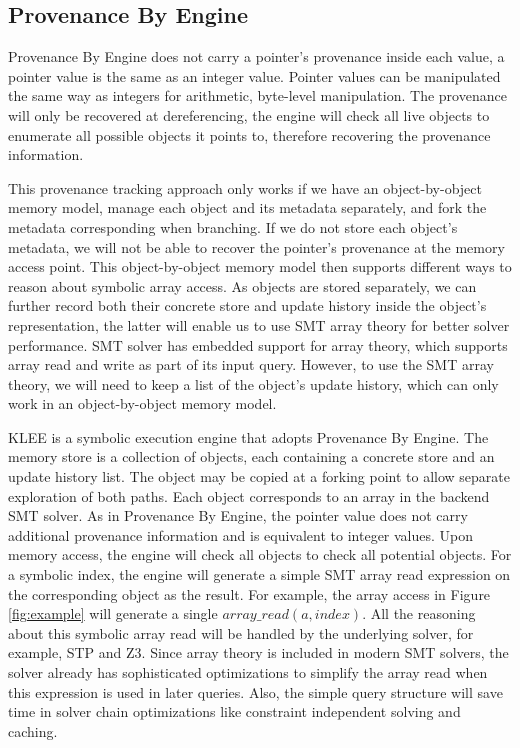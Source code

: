 \documentclass[sigplan, nonacm]{acmart}\settopmatter{printfolios=true,printccs=false,printacmref=false}
\newcommand{\klee}{\textsc{KLEE}\xspace}
\begin{document}
\subsection[]{Provenance By Engine}
Provenance By Engine does not carry a pointer's provenance inside each value, a pointer value is the same as an integer value. Pointer values can be manipulated the same way as integers for arithmetic, byte-level manipulation. The provenance will only be recovered at dereferencing, the engine will check all live objects to enumerate all possible objects it points to, therefore recovering the provenance information.\par
This provenance tracking approach only works if we have an object-by-object memory model, manage each object and its metadata separately, and fork the metadata corresponding when branching. If we do not store each object's metadata, we will not be able to recover the pointer's provenance at the memory access point. This object-by-object memory model then supports different ways to reason about symbolic array access. As objects are stored separately, we can further record both their concrete store and update history inside the object's representation, the latter will enable us to use SMT array theory for better solver performance. SMT solver has embedded support for array theory, which supports array read and write as part of its input query. However, to use the SMT array theory, we will need to keep a list of the object's update history, which can only work in an object-by-object memory model.\par
\klee is a symbolic execution engine that adopts Provenance By Engine. The memory store is a collection of objects, each containing a concrete store and an update history list. The object may be copied at a forking point to allow separate exploration of both paths. Each object corresponds to an array in the backend SMT solver. As in Provenance By Engine, the pointer value does not carry additional provenance information and is equivalent to integer values. Upon memory access, the engine will check all objects to check all potential objects. For a symbolic index, the engine will generate a simple SMT array read expression on the corresponding object as the result. For example, the array access in Figure \ref{fig:example} will generate a single $array\_read(a, index)$. All the reasoning about this symbolic array read will be handled by the underlying solver, for example, STP and Z3. Since array theory is included in modern SMT solvers, the solver already has sophisticated optimizations to simplify the array read when this expression is used in later queries. Also, the simple query structure will save time in solver chain optimizations like constraint independent solving and caching.
\end{document}
